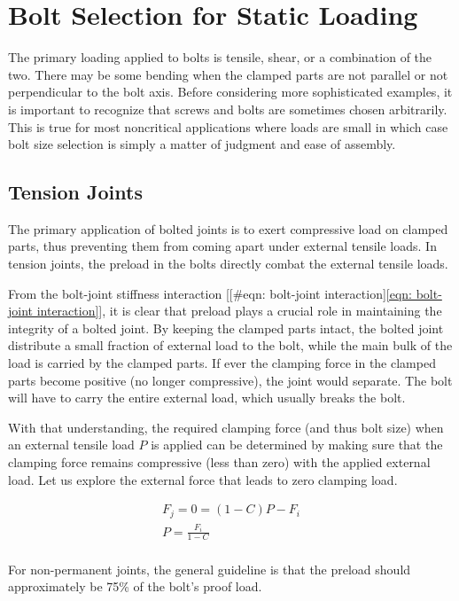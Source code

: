 \documentclass[a4paper,openany,12pt]{book}
\begin{document}
{{\section{Bolt Selection for Static Loading}
\label{bolt-selection-for-static-loading}
The primary loading applied to bolts is tensile, shear, or a combination
of the two. There may be some bending when the clamped parts are not
parallel or not perpendicular to the bolt axis. Before considering more
sophisticated examples, it is important to recognize that screws and
bolts are sometimes chosen arbitrarily. This is true for most
noncritical applications where loads are small in which case bolt size
selection is simply a matter of judgment and ease of assembly.

\subsection{Tension Joints}
\label{tension-joints}
The primary application of bolted joints is to exert compressive load on
clamped parts, thus preventing them from coming apart under external
tensile loads. In tension joints, the preload in the bolts directly
combat the external tensile loads.

From the bolt-joint stiffness interaction
[[\#eqn: bolt-joint interaction]\ref{eqn: bolt-joint interaction}], it is
clear that preload plays a crucial role in maintaining the integrity of
a bolted joint. By keeping the clamped parts intact, the bolted joint
distribute a small fraction of external load to the bolt, while the main
bulk of the load is carried by the clamped parts. If ever the clamping
force in the clamped parts become positive (no longer compressive), the
joint would separate. The bolt will have to carry the entire external
load, which usually breaks the bolt.

With that understanding, the required clamping force (and thus bolt
size) when an external tensile load \(P\) is applied can be determined by
making sure that the clamping force remains compressive (less than zero)
with the applied external load. Let us explore the external force that
leads to zero clamping load.

$$\begin{gathered}
  F_j = 0 = (1 - C)P - F_i \\ 
  P = \frac{F_i}{1 - C} \\ 
\end{gathered}$$

For non-permanent joints, the general guideline is that the preload
should approximately be 75\% of the bolt's proof load.

}}
\end{document}
